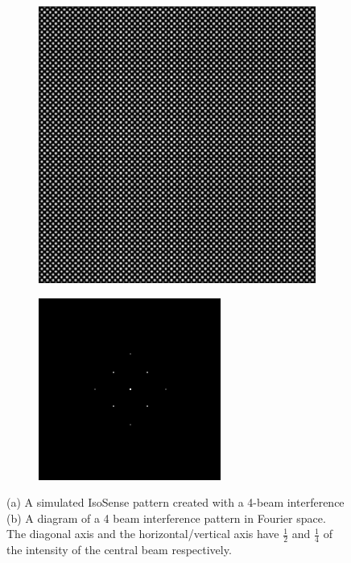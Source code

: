 \begin{figure}[h]
	\centering
	\begin{subfigure}{0.4\textwidth}
		\includegraphics{./images/isosense_visualisation_real.png}
		\caption{}
		\label{fig:isosense_visualisation_real}
	\end{subfigure}
	\begin{subfigure}{0.4\textwidth}
		\includegraphics{./images/isosense_visualisation_ft.png}
		\caption{}
		\label{fig:isosense_visualisation_ft}
	\end{subfigure}
	\caption{(a) A simulated IsoSense pattern created with a 4-beam interference (b) A diagram of a 4 beam interference pattern in Fourier space. The diagonal axis and the horizontal/vertical axis have $\frac{1}{2}$ and $\frac{1}{4}$ of the intensity of the central beam respectively.}
	\label{fig:isosense_visualisation}
\end{figure}

